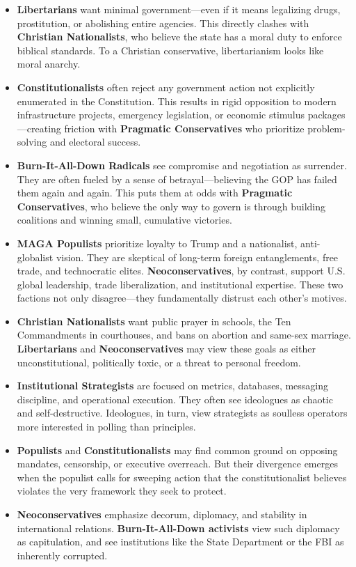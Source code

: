 \begin{itemize}
\item \textbf{Libertarians} want minimal government—even if it means legalizing drugs, prostitution, or abolishing entire agencies. This directly clashes with \textbf{Christian Nationalists}, who believe the state has a moral duty to enforce biblical standards. To a Christian conservative, libertarianism looks like moral anarchy.

\item \textbf{Constitutionalists} often reject any government action not explicitly enumerated in the Constitution. This results in rigid opposition to modern infrastructure projects, emergency legislation, or economic stimulus packages—creating friction with \textbf{Pragmatic Conservatives} who prioritize problem-solving and electoral success.

\item \textbf{Burn-It-All-Down Radicals} see compromise and negotiation as surrender. They are often fueled by a sense of betrayal—believing the GOP has failed them again and again. This puts them at odds with \textbf{Pragmatic Conservatives}, who believe the only way to govern is through building coalitions and winning small, cumulative victories.

\item \textbf{MAGA Populists} prioritize loyalty to Trump and a nationalist, anti-globalist vision. They are skeptical of long-term foreign entanglements, free trade, and technocratic elites. \textbf{Neoconservatives}, by contrast, support U.S. global leadership, trade liberalization, and institutional expertise. These two factions not only disagree—they fundamentally distrust each other’s motives.

\item \textbf{Christian Nationalists} want public prayer in schools, the Ten Commandments in courthouses, and bans on abortion and same-sex marriage. \textbf{Libertarians} and \textbf{Neoconservatives} may view these goals as either unconstitutional, politically toxic, or a threat to personal freedom.

\item \textbf{Institutional Strategists} are focused on metrics, databases, messaging discipline, and operational execution. They often see ideologues as chaotic and self-destructive. Ideologues, in turn, view strategists as soulless operators more interested in polling than principles.

\item \textbf{Populists} and \textbf{Constitutionalists} may find common ground on opposing mandates, censorship, or executive overreach. But their divergence emerges when the populist calls for sweeping action that the constitutionalist believes violates the very framework they seek to protect.

\item \textbf{Neoconservatives} emphasize decorum, diplomacy, and stability in international relations. \textbf{Burn-It-All-Down activists} view such diplomacy as capitulation, and see institutions like the State Department or the FBI as inherently corrupted.

\end{itemize}

